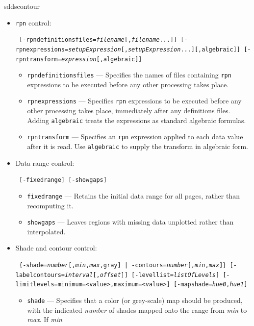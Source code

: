 \begin{sddsprog}{sddscontour}
\begin{itemize}
    \item \verb|rpn| control:
\begin{flushleft}{\tt
[-rpndefinitionsfiles={\em filename}[,{\em filename}...]]
[-rpnexpressions={\em setupExpression}[,{\em setupExpression}...][,algebraic]]
[-rpntransform={\em expression}[,algebraic]]
}\end{flushleft}
        \begin{itemize}
        \item \verb|rpndefinitionsfiles| --- Specifies the names of files containing \verb|rpn| expressions
        to be executed before any other processing takes place.
        \item \verb|rpnexpressions| --- Specifies \verb|rpn| expressions to be executed before any other processing
         takes place, immediately after any definitions files.  Adding \verb|algebraic| treats the
         expressions as standard algebraic formulas.
        \item \verb|rpntransform| --- Specifies an \verb|rpn| expression applied to each data value after it is read.
         Use \verb|algebraic| to supply the transform in algebraic form.
        \end{itemize}
    \item Data range control:
\begin{flushleft}{\tt
[-fixedrange] [-showgaps]
}\end{flushleft}
        \begin{itemize}
        \item \verb|fixedrange| --- Retains the initial data range for all pages, rather than recomputing it.
        \item \verb|showgaps| --- Leaves regions with missing data unplotted rather than interpolated.
        \end{itemize}
    \item Shade and contour control:
\begin{flushleft}{\tt
\{-shade={\em number}[,{\em min},{\em max},gray] | -contours={\em number}[,{\em min},{\em max}]\}
[-labelcontours={\em interval}[,{\em offset}]]
[-levellist={\em listOfLevels}] [-limitlevels={minimum=<value>,}{maximum=<value>}]
[-mapshade={\em hue0},{\em hue1}]
}\end{flushleft}
        \begin{itemize}
        \item \verb|shade| --- Specifies that a color (or grey-scale) map should be produced, with the
        indicated {\em number} of shades mapped onto the range from {\em min} to {\em max}.  If {\em min}

\end{itemize}
\end{itemize}
\end{sddsprog}
